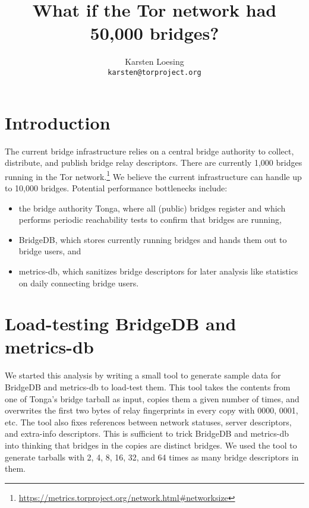 \documentclass{article}
\begin{document}
\title{What if the Tor network had 50,000 bridges?}
\author{Karsten Loesing\\{\tt karsten@torproject.org}}

\maketitle

\section{Introduction}

The current bridge infrastructure relies on a central bridge authority to
collect, distribute, and publish bridge relay descriptors.
There are currently 1,000 bridges running in the Tor network.\footnote{%
\url{https://metrics.torproject.org/network.html#networksize}}
We believe the current infrastructure can handle up to 10,000 bridges.
Potential performance bottlenecks include:

\begin{itemize}
\item the bridge authority Tonga, where all (public) bridges register and
which performs periodic reachability tests to confirm that bridges are
running,
\item BridgeDB, which stores currently running bridges and hands them out
to bridge users, and
\item metrics-db, which sanitizes bridge descriptors for later analysis
like statistics on daily connecting bridge users.
\end{itemize}

\section{Load-testing BridgeDB and metrics-db}

We started this analysis by writing a small tool to generate sample data
for BridgeDB and metrics-db to load-test them.
This tool takes the contents from one of Tonga's bridge tarball as input,
copies them a given number of times, and overwrites the first two bytes of
relay fingerprints in every copy with 0000, 0001, etc.
The tool also fixes references between network statuses, server
descriptors, and extra-info descriptors.
This is sufficient to trick BridgeDB and metrics-db into thinking that
bridges in the copies are distinct bridges.
We used the tool to generate tarballs with 2, 4, 8, 16, 32, and 64 times
as many bridge descriptors in them.
\end{document}
